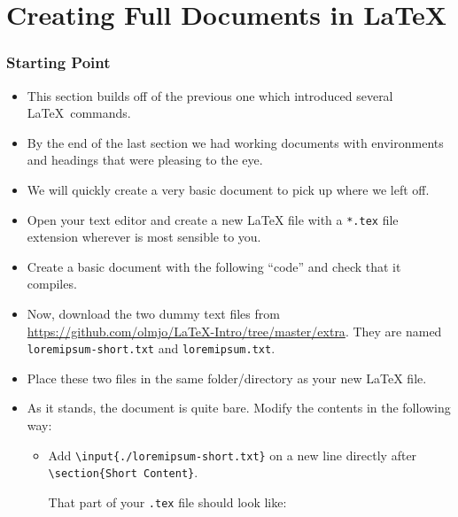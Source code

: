 \part{Creating Full Documents in \LaTeX}

\section{Starting Point}

\begin{itemize}

\item This section builds off of the previous one which introduced several
  \LaTeX{}~commands.

\item By the end of the last section we had working documents with environments
  and headings that were pleasing to the eye.

\item We will quickly create a very basic document to pick up where we
  left off.

\item Open your text editor and create a new \LaTeX{} file with a \texttt{*.tex}
  file extension wherever is most sensible to you.

\item Create a basic document with the following ``code'' and check that
  it compiles.



\item Now, download the two dummy text files from
  \url{https://github.com/olmjo/LaTeX-Intro/tree/master/extra}. They are named
  \verb=loremipsum-short.txt= and \verb=loremipsum.txt=.

\item Place these two files in the same folder/directory as your new \LaTeX{}
  file.

\item As it stands, the document is quite bare. Modify the contents in the
  following way:
  \begin{itemize}

  \item Add \texttt{\textbackslash input\{./loremipsum-short.txt\}}
    on a new line directly after \texttt{\textbackslash section\{Short
      Content\}}.

    That part of your \texttt{.tex} file should look like:


\end{itemize}
\end{itemize}
